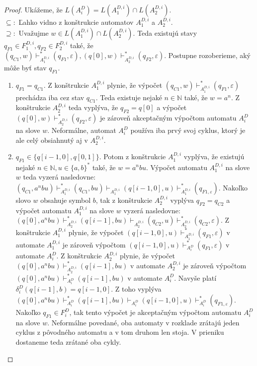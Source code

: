 \begin{proof}
Ukážeme, že $ L(A_i^D) = L(A_1^{D,i}) \cap L(A_2^{D,i}) $. \\
$ \subseteq: $ Ľahko vidno z konštrukcie automatov $ A_1^{D,i}$ a $ A_2^{D,i} $. \\
$ \supseteq: $ Uvažujme $ w \in L(A_1^{D,i}) \cap L(A_2^{D,i}) $. Teda existujú stavy $ q_{F1} \in F_1^{D,i}, q_{F2} \in F_2^{D,i}$ také, že $ (q_{C1},w) \vdash_{A_1^{D,i}}^* (q_{F1}, \varepsilon), (q[0],w) \vdash_{A_2^{D,i}}^* (q_{F2}, \varepsilon)$. Postupne rozoberieme, aký môže byť stav $ q_{F1} $.
\begin{enumerate}
\item $ q_{F1} = q_{C1} $. Z konštrukcie $ A_1^{D,i} $ plynie, že výpočet $ (q_{C1},w) \vdash_{A_1^{D,i}}^* (q_{F1}, \varepsilon)$ prechádza iba cez stav $ q_{C1} $. Teda existuje nejaké $ n \in \mathbb{N} $ také, že $ w=a^n $. Z konštrukcie $ A_2^{D,i} $ teda vyplýva, že $ q_{F2} = q[0] $ a výpočet $ (q[0],w) \vdash_{A_2^{D,i}}^* (q_{F2}, \varepsilon) $ je zároveň akceptačným výpočtom automatu $ A_i^D $ na slove $ w $. Neformálne, automat $ A_i^D $ používa iba prvý svoj cyklus, ktorý je ale celý obsiahnutý aj v $ A_2^{D,i} $.
\item $ q_{F1} \in \lbrace q[i-1,0],q[0,1] \rbrace $. Potom z konštrukcie $ A_1^{D,i} $ vyplýva, že existujú nejaké $ n \in \mathbb{N}, u \in \lbrace a,b \rbrace^* $ také, že $ w = a^nbu $. Výpočet automatu $ A_1^{D,i} $ na slove $ w $ teda vyzerá nasledovne: $ (q_{C1},a^nbu) \vdash_{A_1^{D,i}}^* (q_{C1},bu) \vdash_{A_1^{D,i}} (q[i-1,0],u) \vdash_{A_1^{D,i}}^* (q_{F1, \varepsilon}) $. Nakoľko slovo $ w $ obsahuje symbol $ b $, tak z konštrukcie $ A_2^{D,i} $ vyplýva $ q_{F2} = q_{C2} $ a výpočet automatu $ A_1^{D,i} $ na slove $ w $ vyzerá nasledovne: $ (q[0],a^nbu) \vdash_{A_2^{D,i}}^* (q[i-1],bu) \vdash_{A_2^{D,i}} (q_{C2},u) \vdash_{A_2^{D,i}}^* (q_{C2},\varepsilon)$. Z konštrukcie $ A_1^{D,i} $ plynie, že výpočet $ (q[i-1,0],u) \vdash_{A_1^{D,i}}^* (q_{F1}, \varepsilon) $ v automate $ A_1^{D,i} $ je zároveň výpočtom $ (q[i-1,0],u) \vdash_{A_i^D}^* (q_{F1}, \varepsilon) $ v automate $  A_i^D $. Z konštrukcie $ A_2^{D,i} $ plynie, že výpočet $ (q[0],a^nbu) \vdash_{A_2^{D,i}}^* (q[i-1],bu) $ v automate $ A_2^{D,i} $ je zároveň výpočtom $ (q[0],a^nbu) \vdash_{A_i^D}^* (q[i-1],bu) $ v automate $  A_i^D $. Navyše platí $ \delta_i^D(q[i-1],b) = q[i-1,0] $. Z toho vyplýva $ (q[0],a^nbu) \vdash_{A_i^D}^* (q[i-1],bu) \vdash_{A_i^D} (q[i-1,0],u) \vdash_{A_i^D}^* (q_{F1, \varepsilon}) $. Nakoľko $ q_{F1} \in F_i^D $, tak tento výpočet je akceptačným výpočtom automatu $ A_i^D $ na slove $ w $. Neformálne povedané, oba automaty v rozklade zrátajú jeden cyklus z pôvodného automatu a v tom druhom len stoja. V prieniku dostaneme teda zrátané oba cykly.
\end{enumerate}


\end{proof}
